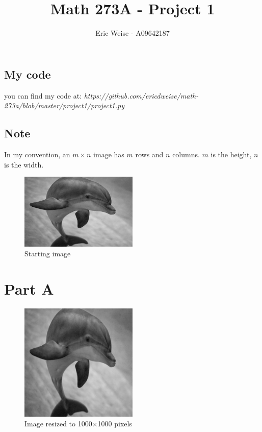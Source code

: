 \documentclass{article}
\title{Math 273A - Project 1}
\author{Eric Weise - A09642187}
\begin{document}
\maketitle

\subsection*{My code}
you can find my code at:
{\it  https://github.com/ericdweise/math-273a/blob/master/project1/project1.py}

\subsection*{Note}
In my convention, an $m\times n$ image has $m$ rows and $n$ columns. $m$ is the height, $n$ is the width.

\begin{figure}[H]
    \caption{Starting image}
    \centering
        \includegraphics[width=0.5\textwidth]{part-0.png}
\end{figure}


\newpage
\section*{Part A}
\begin{figure}[H]
    \caption{Image resized to 1000$\times$1000 pixels}
    \centering
        \includegraphics[width=0.5\textwidth]{part-a.png}
\end{figure}
\end{document}
